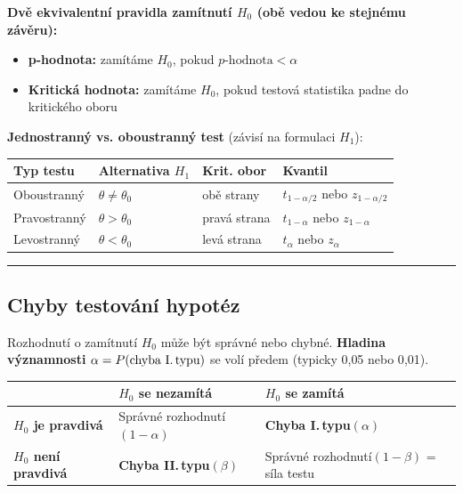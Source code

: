 \documentclass[a4paper, 11pt]{article}
\begin{document}
\medskip
\noindent\textbf{Dvě ekvivalentní pravidla zamítnutí $H_0$ (obě vedou ke stejnému závěru):}

\begin{itemize}[noitemsep]
	\item \textbf{p-hodnota:} zamítáme $H_0$, pokud $p\text{-hodnota} < \alpha$
	\item \textbf{Kritická hodnota:} zamítáme $H_0$, pokud testová statistika padne do kritického oboru
\end{itemize}

\medskip
\noindent\textbf{Jednostranný vs. oboustranný test} (závisí na formulaci $H_1$):

{\renewcommand{\arraystretch}{1.3}
\begin{tabular}{p{} p{} p{} p{}}
	\textbf{Typ testu} & \textbf{Alternativa $H_1$} & \textbf{Krit. obor} & \textbf{Kvantil} \\
	\midrule
	Oboustranný & $\theta \ne \theta_0$ & obě strany & $t_{1-\alpha/2}$ nebo $z_{1-\alpha/2}$ \\
	Pravostranný & $\theta > \theta_0$ & pravá strana & $t_{1-\alpha}$ nebo $z_{1-\alpha}$ \\
	Levostranný & $\theta < \theta_0$ & levá strana & $t_\alpha$ nebo $z_\alpha$ \\
\end{tabular}}

\noindent\hrule\medskip

\subsection{Chyby testování hypotéz}

Rozhodnutí o zamítnutí $H_0$ může být správné nebo chybné.
\textbf{Hladina významnosti} $\alpha = P(\text{chyba I.\,typu})$ se volí předem (typicky 0{,}05 nebo 0{,}01).

\medskip
{\renewcommand{\arraystretch}{1.6}
\begin{tabular}{p{} | p{} | p{}}
	& \textbf{$H_0$ se nezamítá} & \textbf{$H_0$ se zamítá} \\
	\hline
	\textbf{$H_0$ je pravdivá}
		& Správné rozhodnutí\newline$(1-\alpha)$
		& \textbf{Chyba I.\,typu}\newline$(\alpha)$ \\
	\hline
	\textbf{$H_0$ není pravdivá}
		& \textbf{Chyba II.\,typu}\newline$(\beta)$
		& Správné rozhodnutí\newline$(1-\beta)$ = síla testu \\
\end{tabular}}
\end{document}
